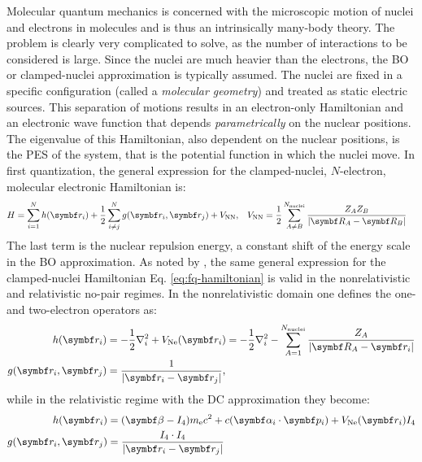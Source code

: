 Molecular quantum mechanics is concerned with the microscopic motion of
nuclei and electrons in molecules and is thus an intrinsically many-body
theory. The problem is clearly very complicated to solve, as the number of
interactions to be considered is large.
Since the nuclei are much heavier than the electrons, the \gls{BO} or
clamped-nuclei approximation is typically assumed. The nuclei are fixed
in a specific configuration (called a \emph{molecular geometry}) and
treated as static electric sources.\autocite{Born1927-ce}
This separation of motions results in an electron-only Hamiltonian and
an electronic wave function that depends \emph{parametrically} on the
nuclear positions. The eigenvalue of this Hamiltonian, also dependent on
the nuclear positions, is the \gls{PES} of the system, that is the
potential function in which the nuclei move.\autocite{Szabo1989-vl,
McWeeny1992-oj}
In first quantization, the general expression for the clamped-nuclei,
$N$-electron, molecular electronic Hamiltonian is:
\begin{alignat}{2}\label{eq:fq-hamiltonian}
  H = \sum_{i=1}^N h(\vect{r}_i)
  + \frac{1}{2}\sum_{i\neq j}^N g(\vect{r}_i, \vect{r}_j)
  + V_\mathrm{NN},
  \quad&
  V_\mathrm{NN} =
  \frac{1}{2}\sum_{A \neq B}^{N_\mathrm{nuclei}}\frac{Z_A Z_B}{|\vect{R}_A - \vect{R}_B|}
\end{alignat}
The last term is the nuclear repulsion energy, a constant shift of the
energy scale in the \acrshort{BO} approximation.
As noted by \citeauthor{Saue2011-qg}, the same general expression for
the clamped-nuclei Hamiltonian Eq. \eqref{eq:fq-hamiltonian} is valid in
the nonrelativistic and relativistic no-pair
regimes.\autocite{Sucher1980-vf, Saue2011-qg}
In the nonrelativistic domain one defines the one- and two-electron
operators as:\autocite{Szabo1989-vl, McWeeny1992-oj, Konishi2009-zb}
\begin{subequations}
 \begin{align}
   h(\vect{r}_i) &=
   -\frac{1}{2}\nabla^2_i + V_\mathrm{Ne}(\vect{r}_i)
   = -\frac{1}{2}\nabla^2_i - \sum_{A=1}^{N_\mathrm{nuclei}}\frac{Z_A}{|\vect{R}_A -
   \vect{r}_i|} \label{eq:h} \\
   g(\vect{r}_i, \vect{r}_j) &= \frac{1}{|\vect{r}_i - \vect{r}_j|},
   \label{eq:g-coulomb}
 \end{align}
\end{subequations}
while in the relativistic regime with the \gls{DC}
approximation they become:\autocite{Dyall2007-tu, Konishi2009-zb, Reiher2014-cp}
\begin{subequations}
 \begin{align}
   h(\vect{r}_i) &= (\mat{\beta} - I_4)\si{\electronmass}c^2 +
   c(\mat{\alpha}_i\cdot\vect{p}_i) + V_{\mathrm{Ne}}(\vect{r}_i)I_4 \\
   g(\vect{r}_i, \vect{r}_j) &= \frac{I_4\cdot I_4}{|\vect{r}_i - \vect{r}_j|}
   \label{eq:g-r-coulomb}
 \end{align}
\end{subequations}
